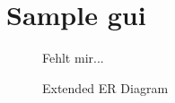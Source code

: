 \pagebreak
\section{Sample gui}

\begin{figure}[h]

\begin{minipage}{14cm}
Fehlt mir...

\caption{Extended ER Diagram}
\end{minipage}
\end{figure}

\noindent
